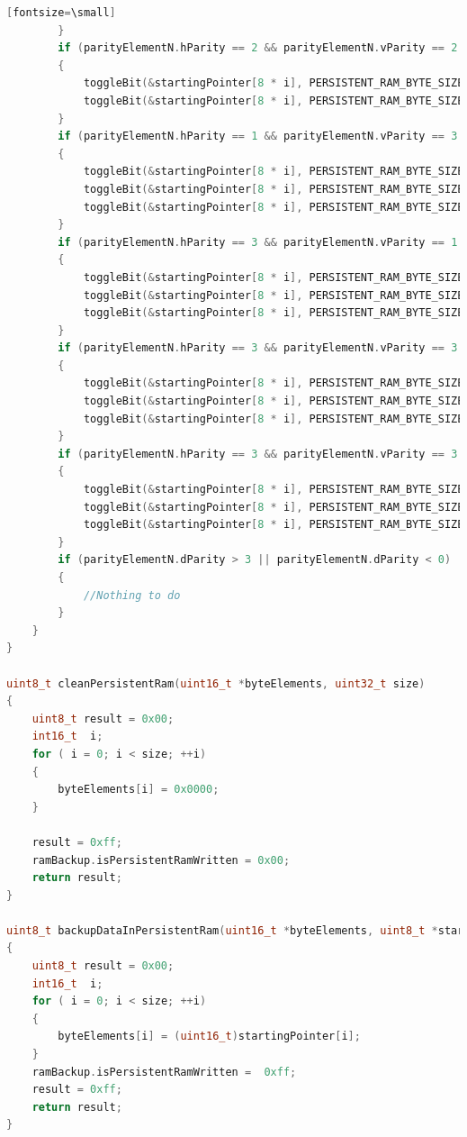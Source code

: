 \documentclass[LaM,binding=0.6cm]{../sapthesis}
\begin{document}
\begin{lstlisting}[language=c][fontsize=\small]
        }
        if (parityElementN.hParity == 2 && parityElementN.vParity == 2 && parityElementN.dParity == 0)
        {
            toggleBit(&startingPointer[8 * i], PERSISTENT_RAM_BYTE_SIZE, h[0], v[1]);
            toggleBit(&startingPointer[8 * i], PERSISTENT_RAM_BYTE_SIZE, h[1], v[0]);
        }
        if (parityElementN.hParity == 1 && parityElementN.vParity == 3 && parityElementN.dParity == 3)
        {
            toggleBit(&startingPointer[8 * i], PERSISTENT_RAM_BYTE_SIZE, h[0], v[0]);
            toggleBit(&startingPointer[8 * i], PERSISTENT_RAM_BYTE_SIZE, h[0], v[1]);
            toggleBit(&startingPointer[8 * i], PERSISTENT_RAM_BYTE_SIZE, h[0], v[2]);
        }
        if (parityElementN.hParity == 3 && parityElementN.vParity == 1 && parityElementN.dParity == 3)
        {
            toggleBit(&startingPointer[8 * i], PERSISTENT_RAM_BYTE_SIZE, h[0], v[0]);
            toggleBit(&startingPointer[8 * i], PERSISTENT_RAM_BYTE_SIZE, h[1], v[0]);
            toggleBit(&startingPointer[8 * i], PERSISTENT_RAM_BYTE_SIZE, h[2], v[0]);
        }
        if (parityElementN.hParity == 3 && parityElementN.vParity == 3 && parityElementN.dParity == 1)
        {
            toggleBit(&startingPointer[8 * i], PERSISTENT_RAM_BYTE_SIZE, h[2], v[0]);
            toggleBit(&startingPointer[8 * i], PERSISTENT_RAM_BYTE_SIZE, h[1], v[1]);
            toggleBit(&startingPointer[8 * i], PERSISTENT_RAM_BYTE_SIZE, h[0], v[2]);
        }
        if (parityElementN.hParity == 3 && parityElementN.vParity == 3 && parityElementN.dParity == 3 && (d[0] == h[0] + v[0]) && (d[1] == h[1] + v[1]) && (d[2] == h[2] + v[2]))
        {
            toggleBit(&startingPointer[8 * i], PERSISTENT_RAM_BYTE_SIZE, h[0], v[0]);
            toggleBit(&startingPointer[8 * i], PERSISTENT_RAM_BYTE_SIZE, h[1], v[1]);
            toggleBit(&startingPointer[8 * i], PERSISTENT_RAM_BYTE_SIZE, h[2], v[2]);
        }
        if (parityElementN.dParity > 3 || parityElementN.dParity < 0)
        {
            //Nothing to do
        }
    }
}

uint8_t cleanPersistentRam(uint16_t *byteElements, uint32_t size)
{
    uint8_t result = 0x00;
    int16_t  i;
    for ( i = 0; i < size; ++i)
    {
        byteElements[i] = 0x0000;
    }

    result = 0xff;
    ramBackup.isPersistentRamWritten = 0x00;
    return result;
}

uint8_t backupDataInPersistentRam(uint16_t *byteElements, uint8_t *startingPointer, uint32_t size)
{
    uint8_t result = 0x00;
    int16_t  i;
    for ( i = 0; i < size; ++i)
    {
        byteElements[i] = (uint16_t)startingPointer[i];
    }
    ramBackup.isPersistentRamWritten =  0xff;
    result = 0xff;
    return result;
}


\end{lstlisting}
\end{document}
